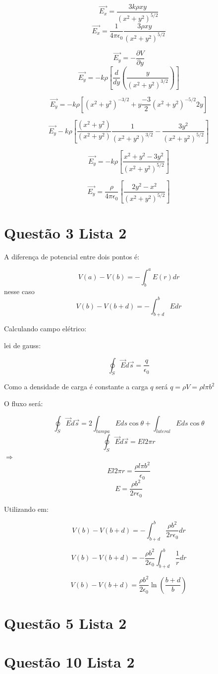 \documentclass[a4paper, 12pt]{article}
\begin{document}
\[\vec{E_x}=\frac{3k\rho xy}{(x^2+y^2)^{5/2}}\]
\[\vec{E_x}=\frac{1}{4\pi\epsilon_0}\frac{3\rho xy}{(x^2+y^2)^{5/2}}\]

\[\vec{E_y}=-\frac{\partial V}{\partial y}\]
\[\vec{E_y}=-k\rho\left[\frac{d}{dy}\left(\frac{y}{(x^2+y^2)^{3/2}}\right)\right]\]

\[\vec{E_y}=-k\rho\left[(x^2+y^2)^{-3/2}+y\frac{-3}{2}(x^2+y^2)^{-5/2}2y\right]\]

\[\vec{E_y}-k\rho\left[\dfrac{(x^2+y^2)}{(x^2+y^2)}\dfrac{1}{(x^2+y^2)^{3/2}}-\frac{3y^2}{(x^2+y^2)^{5/2}}\right]\]

\[\vec{E_y}=-k\rho\left[\frac{x^2+y^2-3y^2}{(x^2+y^2)^{5/2}}\right]\]

\[\vec{E_y}=\frac{\rho}{4\pi\epsilon_0}\left[\dfrac{2y^2-x^2}{(x^2+y^2)^{5/2}}\right]\]

\section{Questão 3 Lista 2}

A diferença de potencial entre dois pontos é:

\[V(a)-V(b)=-\int_{b}^{a}E(r)dr\]nesse caso\[V(b)-V(b+d)=-\int_{b+d}^{b}Edr\]

Calculando campo elétrico:

lei de gauss:

\[
\oint_S \vec{E}d\vec{s}=\frac{q}{\epsilon_0}\]

Como a densidade de carga é constante a carga $q$ será $q=\rho V=\rho l\pi b^2$

O fluxo será:

\[\oint_S\vec{E}d\vec{s}=2\int_{tampa}Eds\cos\theta+\int_{lateral}Eds\cos\theta\]
\[\oint_S\vec{E}d\vec{s}=El2\pi r\]$\Rightarrow$
\[El2\pi r=\frac{\rho l\pi b^2}{\epsilon_0}\]
\[E=\frac{\rho b^2}{2r\epsilon_0}\]

Utilizando em:

\[V(b)-V(b+d)=-\int_{b+d}^{b}\frac{\rho b^2}{2r\epsilon_0}dr\]

\[V(b)-V(b+d)=-\frac{\rho b^2}{2\epsilon_0}\int_{b+d}^{b}\frac{1}{r}dr\]

\[V(b)-V(b+d)=\frac{\rho b^2}{2\epsilon_0}\ln\left(\dfrac{b+d}{b}\right)\]

\section{Questão 5 Lista 2}



\section{Questão 10 Lista 2}
\end{document}
